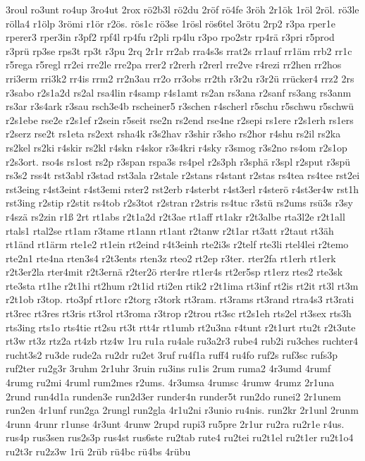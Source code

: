 {3roul
ro3unt
ro4up
3ro4ut
2rox
rö2b3l
rö2du
2röf
rö4fe
3röh
2r1ök
1röl
2röl.
rö3le
rölla4
r1ölp
3römi
r1ör
r2ös.
rös1c
rö3se
1rösl
rös6tel
3rötu
2rp2
r3pa
rper1e
rperer3
rper3in
r3pf2
rpf4l
rp4fu
r2pli
rp4lu
r3po
rpo2str
rp4rä
r3pri
r5prod
r3prü
rp3se
rps3t
rp3t
r3pu
2rq
2r1r
rr2ab
rra4s3s
rrat2s
rr1auf
rr1äm
rrb2
rr1c
r5rega
r5regl
rr2ei
rre2le
rre2pa
rrer2
r2rerh
r2rerl
rre2ve
r4rezi
rr2hen
rr2hos
rri3erm
rri3k2
rr4is
rrm2
rr2n3au
rr2o
rr3obs
rr2th
r3r2u
r3r2ü
rrücker4
rrz2
2rs
r3sabo
r2s1a2d
rs2al
rsa4lin
r4samp
r4s1amt
rs2an
rs3ana
r2sanf
rs3ang
rs3anm
rs3ar
r3s4ark
r3sau
rsch3e4b
rscheiner5
r3schen
r4scherl
r5schu
r5schwu
r5schwü
r2s1ebe
rse2e
r2s1ef
r2sein
r5seit
rse2n
rs2end
rse4ne
r2sepi
rs1ere
r2s1erh
rs1ers
r2serz
rse2t
rs1eta
rs2ext
rsha4k
r3s2hav
r3shir
r3sho
rs2hor
r4shu
rs2il
rs2ka
rs2kel
rs2ki
r4skir
rs2kl
r4skn
r4skor
r3s4kri
r4sky
r3smog
r3s2no
rs4om
r2s1op
r2s3ort.
rso4s
rs1ost
rs2p
r3span
rspa3s
rs4pel
r2s3ph
r3sphä
r3spl
r2sput
r3spü
rs3s2
rss4t
rst3abl
r3stad
rst3ala
r2stale
r2stans
r4stant
r2stas
rs4tea
rs4tee
rst2ei
rst3eing
r4st3eint
r4st3emi
rster2
rst2erb
r4sterbt
r4st3erl
r4sterö
r4st3er4w
rst1h
rst3ing
r2stip
r2stit
rs4tob
r2s3tot
r2stran
r2stris
rs4tuc
r3stü
rs2ums
rsü3s
r3sy
r4szä
rs2zin
r1ß
2rt
rt1abs
r2t1a2d
r2t3ae
rt1aff
rt1akr
r2t3albe
rta3l2e
r2t1all
rtals1
rtal2se
rt1am
r3tame
rt1ann
rt1ant
r2tanw
r2t1ar
rt3att
r2taut
rt3äh
rt1änd
rt1ärm
rte1e2
rt1ein
rt2eind
r4t3einh
rte2i3s
r2telf
rte3li
rtel4lei
r2temo
rte2n1
rte4na
rten3s4
r2t3ents
rten3z
rteo2
rt2ep
r3ter.
rter2fa
rt1erh
rt1erk
r2t3er2la
rter4mit
r2t3ernä
r2ter2ö
rter4re
rt1er4s
rt2er5sp
rt1erz
rtes2
rte3sk
rte3sta
rt1he
r2t1hi
rt2hum
r2t1id
rti2en
rtik2
r2t1ima
rt3inf
rt2is
rt2it
rt3l
rt3m
r2t1ob
r3top.
rto3pf
rt1orc
r2torg
r3tork
rt3ram.
rt3rams
rt3rand
rtra4s3
rt3rati
rt3rec
rt3res
rt3ris
rt3rol
rt3roma
r3trop
r2trou
rt3sc
rt2s1eh
rts2el
rt3sex
rts3h
rts3ing
rts1o
rts4tie
rt2su
rt3t
rtt4r
rt1umb
rt2u3na
r4tunt
r2t1urt
rtu2t
r2t3ute
rt3w
rt3z
rtz2a
rt4zb
rtz4w
1ru
ru1a
ru4ale
ru3a2r3
rube4
rub2i
ru3ches
ruchter4
rucht3s2
ru3de
rude2a
ru2dr
ru2et
3ruf
ru4f1a
ruff4
ru4fo
ruf2s
ruf3sc
rufs3p
ruf2ter
ru2g3r
3ruhm
2r1uhr
3ruin
ru3ins
ru1is
2rum
ruma2
4r3umd
4rumf
4rumg
ru2mi
4ruml
rum2mes
r2ums.
4r3umsa
4rumsc
4rumw
4rumz
2r1una
2rund
run4d1a
runden3e
run2d3er
runder4n
runder5t
run2do
runei2
2r1unem
run2en
4r1unf
run2ga
2rungl
run2gla
4r1u2ni
r3unio
ru4nis.
run2kr
2r1unl
2runm
4runn
4runr
r1unse
4r3unt
4runw
2rupd
rupi3
ru5pre
2r1ur
ru2ra
ru2r1e
r4us.
rus4p
rus3sen
rus2s3p
rus4st
rus6ste
ru2tab
rute4
ru2tei
ru2t1el
ru2t1er
ru2t1o4
ru2t3r
ru2z3w
1rü
2rüb
rü4bc
rü4bs
4rübu
}
